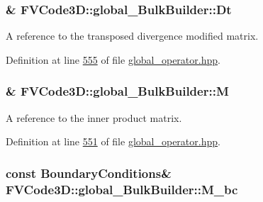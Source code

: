 \subsubsection[{\texorpdfstring{Dt}{Dt}}]{\& F\+V\+Code3\+D\+::global\+\_\+\+Bulk\+Builder\+::\+Dt\hspace{0.3cm}{\ttfamily [private]}}\hypertarget{classFVCode3D_1_1global__BulkBuilder_a30510e925ae588b3993cf39710dcb0e8}{}\label{classFVCode3D_1_1global__BulkBuilder_a30510e925ae588b3993cf39710dcb0e8}


A reference to the transposed divergence modified matrix. 



Definition at line \hyperlink{global__operator_8hpp_source_l00555}{555} of file \hyperlink{global__operator_8hpp_source}{global\+\_\+operator.\+hpp}.

\subsubsection[{\texorpdfstring{M}{M}}]{\& F\+V\+Code3\+D\+::global\+\_\+\+Bulk\+Builder\+::M\hspace{0.3cm}{\ttfamily [private]}}\hypertarget{classFVCode3D_1_1global__BulkBuilder_ab60d3a62f393fea1b68da0a6d0598962}{}\label{classFVCode3D_1_1global__BulkBuilder_ab60d3a62f393fea1b68da0a6d0598962}


A reference to the inner product matrix. 



Definition at line \hyperlink{global__operator_8hpp_source_l00551}{551} of file \hyperlink{global__operator_8hpp_source}{global\+\_\+operator.\+hpp}.

\subsubsection[{\texorpdfstring{M\+\_\+bc}{M_bc}}]{\setlength{\rightskip}{0pt plus 5cm}const {\bf Boundary\+Conditions}\& F\+V\+Code3\+D\+::global\+\_\+\+Bulk\+Builder\+::\+M\+\_\+bc\hspace{0.3cm}{\ttfamily [private]}}\hypertarget{classFVCode3D_1_1global__BulkBuilder_a84240894f7c45fe5633fa7e87335dc1c}{}\label{classFVCode3D_1_1global__BulkBuilder_a84240894f7c45fe5633fa7e87335dc1c}


